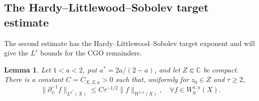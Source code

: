 \documentclass[a4paper,11pt]{article}
\newcommand{\pr}{\partial}
\newcommand{\C}{\mathbb{C}}
\theoremstyle{plain}
\newtheorem{lem}[thm]{Lemma}
\theoremstyle{definition}
\theoremstyle{remark}
\begin{document}
\subsection{The Hardy--Littlewood--Sobolev target estimate}

The second estimate has the Hardy--Littlewood--Sobolev target exponent and will give the $L^{r}$ bounds for the CGO remainders.
\begin{lem}\label{lem-qstar}
Let $1<a<2$, put $a^*=2a/(2-a)$, and let $Z\Subset\C$ be compact.  There is a constant $C=C_{X,Z,a}>0$ such that, uniformly for $z_0\in Z$ and $\tau\geq2$,
\begin{equation}
\|\pr_\psi^{-1}f\|_{L^{a^*}(X)}\leq C \tau^{-1/2}\|f\|_{W^{1,a}(X)}, \quad\forall f\in W^{1,a}_0(X).
\end{equation}
\end{lem}
\end{document}
